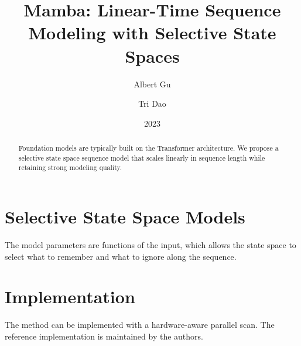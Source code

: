 \documentclass{article}
\title{Mamba: Linear-Time Sequence Modeling with Selective State Spaces}
\author{Albert Gu \and Tri Dao}
\date{2023}
\begin{document}
        \maketitle

        \begin{abstract}
        Foundation models are typically built on the Transformer architecture. We propose a
        selective state space sequence model that scales linearly in sequence length while
        retaining strong modeling quality.
        \end{abstract}

        \section{Selective State Space Models}
        The model parameters are functions of the input, which allows the state space to
        select what to remember and what to ignore along the sequence.

        \section{Implementation}
        The method can be implemented with a hardware-aware parallel scan. The reference
        implementation is maintained by the authors.

        
        
\end{document}
